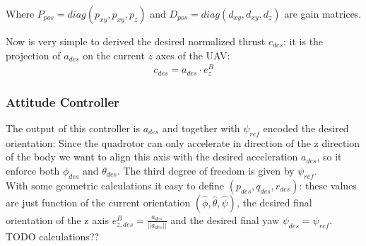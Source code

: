 Where $P_{pos} = diag(p_{xy} ,p_{xy} ,p_{z} )$ and $D_{pos} = diag(d_{xy} ,d_{xy} ,d_{z} )$ are gain matrices.

Now is very simple to derived the desired normalized thrust  $c_{des}$: it is the projection of  $a_{des}$  on the current $z$ axes of the UAV:
\begin{align}
c_{des} = a_{des} \cdot e_z^B
\label{eq:thrust}
\end{align}

\subsubsection{Attitude Controller}
The output of this controller is $a_{des}$ and together with $\psi_{ref}$ encoded the desired orientation:
Since the quadrotor can only accelerate in direction of the z direction of the body we want to align this axis  with the desired acceleration $a_{des}$, so it enforce both $\phi_{des}$ and $\theta_{des}$. The third degree of freedom is given by $\psi_{ref}$.\\
With some geometric calculations it easy to define $(p_{des},q_{des},r_{des})$: these values are just function of the current orientation $(\hat{\phi},\hat{\theta},\hat{\psi})$, the desired final orientation of the z axis $e_{z,des}^B = \frac{ a_{des}}{|| a_{des}||}$ and the desired final yaw $\psi_{des} = \psi_{ref}$. \\


TODO calculations??\\



